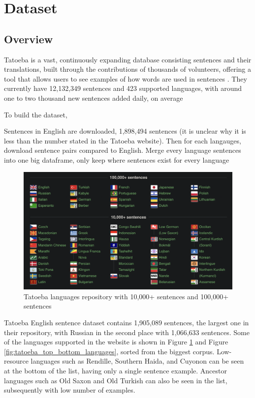 \documentclass[a4paper]{article}
\begin{document}
\section{Dataset}

\subsection{Overview}

Tatoeba is a vast, continuously expanding database consisting sentences and their translations, built through the contributions of thousands of volunteers, offering a tool that allows users to see examples of how words are used in sentences \cite{tatoeba}. They currently have 12,132,349 sentences and 423 supported languages, with around one to two thousand new sentences added daily, on average

To build the dataset,

Sentences in English are downloaded, 1,898,494 sentences (it is unclear why it is less than the number stated in the Tatoeba website). Then for each langauges, download sentence pairs compared to English. Merge every language sentences into one big dataframe, only keep where sentences exist for every language

\begin{figure}[htbp]
    \centering
    \includegraphics[width=0.9\linewidth]{images/tatoeba_languages.png}
    \caption{Tatoeba languages repository with 10,000+ sentences and 100,000+ sentences \cite{tatoeba}}
    \label{fig:tatoeba_languages}
\end{figure}

Tatoeba English sentence dataset contains 1,905,089 sentences, the largest one in their repository, with Russian in the second place with 1,066,633 sentences. Some of the languages supported in the website is shown in Figure \ref{fig:tatoeba_languages} and Figure \ref{fig:tatoeba_top_bottom_languages}, sorted from the biggest corpus. Low-resource languages such as Rendille, Southern Haida, and Cuyonon can be seen at the bottom of the list, having only a single sentence example. Ancestor languages such as Old Saxon and Old Turkish can also be seen in the list, subsequently with low number of examples.
\end{document}
